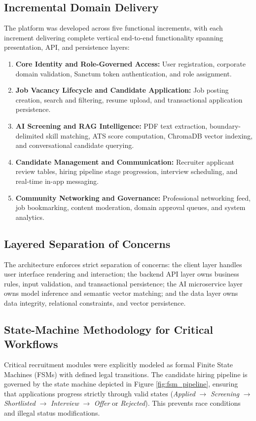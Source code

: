 \subsection{Incremental Domain Delivery}
The platform was developed across five functional increments, with each increment delivering complete vertical end-to-end functionality spanning presentation, API, and persistence layers:
\begin{enumerate}
    \item \textbf{Core Identity and Role-Governed Access:} User registration, corporate domain validation, Sanctum token authentication, and role assignment.
    \item \textbf{Job Vacancy Lifecycle and Candidate Application:} Job posting creation, search and filtering, resume upload, and transactional application persistence.
    \item \textbf{AI Screening and RAG Intelligence:} PDF text extraction, boundary-delimited skill matching, ATS score computation, ChromaDB vector indexing, and conversational candidate querying.
    \item \textbf{Candidate Management and Communication:} Recruiter applicant review tables, hiring pipeline stage progression, interview scheduling, and real-time in-app messaging.
    \item \textbf{Community Networking and Governance:} Professional networking feed, job bookmarking, content moderation, domain approval queues, and system analytics.
\end{enumerate}

\subsection{Layered Separation of Concerns}
The architecture enforces strict separation of concerns: the client layer handles user interface rendering and interaction; the backend API layer owns business rules, input validation, and transactional persistence; the AI microservice layer owns model inference and semantic vector matching; and the data layer owns data integrity, relational constraints, and vector persistence.

\subsection{State-Machine Methodology for Critical Workflows}
Critical recruitment modules were explicitly modeled as formal Finite State Machines (FSMs) with defined legal transitions. The candidate hiring pipeline is governed by the state machine depicted in Figure \ref{fig:fsm_pipeline}, ensuring that applications progress strictly through valid states (\textit{Applied} $\rightarrow$ \textit{Screening} $\rightarrow$ \textit{Shortlisted} $\rightarrow$ \textit{Interview} $\rightarrow$ \textit{Offer} or \textit{Rejected}). This prevents race conditions and illegal status modifications.

